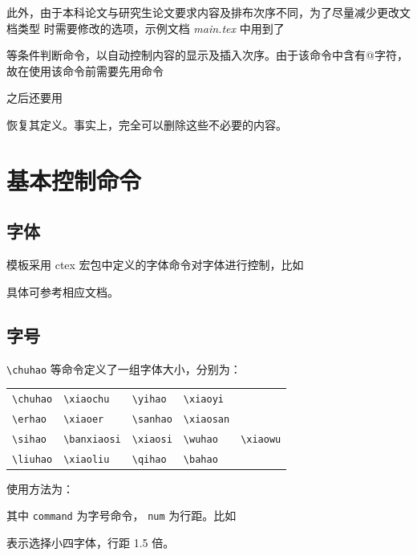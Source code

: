 此外，由于本科论文与研究生论文要求内容及排布次序不同，为了尽量减少更改文档类型
时需要修改的选项，示例文档 \emph{main.tex} 中用到了 
\begin{latex}
\ifhtu@doctor
\end{latex}
等条件判断命令，以自动控制内容的显示及插入次序。由于该命令中含有@字符，
故在使用该命令前需要先用命令
\begin{latex}
\makeatletter
\end{latex}
之后还要用
\begin{latex}
\makeatother
\end{latex}
恢复其定义。事实上，完全可以删除这些不必要的内容。

\section{基本控制命令}

\subsection*{字体}

模板采用 ctex 宏包中定义的字体命令对字体进行控制，比如
\begin{latex}
\songti     %
\fangsong   %
\kaishu     %
\heiti      %
\end{latex}
具体可参考相应文档。

\subsection*{字号}

\verb|\chuhao| 等命令定义了一组字体大小，分别为：

\begin{center}
\begin{tabular}{lllll}
\hline
\verb|\chuhao|&\verb|\xiaochu|&\verb|\yihao|&\verb|\xiaoyi|&\\
\verb|\erhao|&\verb|\xiaoer|&\verb|\sanhao|&\verb|\xiaosan|&\\
\verb|\sihao|&\verb|\banxiaosi|&\verb|\xiaosi|&\verb|\wuhao|&\verb|\xiaowu|\\
\verb|\liuhao|&\verb|\xiaoliu|&\verb|\qihao|&\verb|\bahao|&\\\hline
\end{tabular}
\end{center}

使用方法为：
\begin{latex}
\command[<num>]
\end{latex}
其中 \texttt{command} 为字号命令，
\texttt{num} 为行距。比如
\begin{latex}
\xiaosi[1.5]
\end{latex}
表示选择小四字体，行距 1.5 倍。

